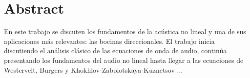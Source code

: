 % 
%
%
% 



\nocite{*}


\chapter*{Abstract}
En este trabajo se discuten los fundamentos de la acústica no lineal y una de sus 
aplicaciones más relevantes: las bocinas direccionales. El trabajo inicia discutiendo
 el análisis clásico de las ecuaciones de onda de audio, continúa presentando los
 fundamentos del audio no lineal hasta llegar a las ecuaciones de Westervelt, 
Burgers y Khokhlov-Zabolotskaya-Kuznetsov ...
\newpage
\tableofcontents
\listoffigures
\listoftables
\listofsymbols 

\newpage
{}






 
